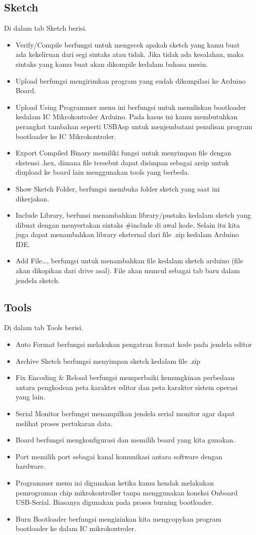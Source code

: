 \subsection{Sketch}
Di dalam tab Sketch berisi.
\begin{itemize}
\item Verify/Compile berfungsi untuk mengecek apakah sketch yang kamu buat ada kekeliruan dari segi sintaks atau tidak. Jika tidak ada kesalahan, maka sintaks yang kamu buat akan dikompile kedalam bahasa mesin.
\item Upload berfungsi mengirimkan program yang sudah dikompilasi ke Arduino Board.
\item Upload Using Programmer menu ini berfungsi untuk menuliskan bootloader kedalam IC Mikrokontroler Arduino. Pada kasus ini kamu membutuhkan perangkat tambahan seperti USBAsp untuk menjembatani penulisan program bootloader ke IC Mikrokontroler.
\item Export Compiled Binary memiliki fungsi untuk menyimpan file dengan ekstensi .hex, dimana file tersebut dapat disimpan sebagai arsip untuk diupload ke board lain menggunakan tools yang berbeda.
\item Show Sketch Folder, berfungsi membuka folder sketch yang saat ini dikerjakan.
\item Include Library, berfunsi menambahkan library/pustaka kedalam sketch yang dibuat dengan menyertakan sintaks \#include di awal kode. Selain itu kita juga dapat menambahkan library eksternal dari file .zip kedalam Arduino IDE.
\item Add File…, berfungsi untuk menambahkan file kedalam sketch arduino (file akan dikopikan dari drive asal). 
File akan muncul sebagai tab baru dalam jendela sketch.
\end{itemize}
\subsection{Tools}
Di dalam tab Tools berisi.
\begin{itemize}
\item Auto Format berfungsi melakukan pengatran format kode pada jendela editor
\item Archive Sketch berfungsi menyimpan sketch kedalam file .zip
\item Fix Encoding \& Reload berfungsi memperbaiki kemungkinan perbedaan antara pengkodean peta karakter editor dan peta karakter sistem operasi yang lain.
\item Serial Monitor berfungsi menampilkan jendela serial monitor agar dapat melihat proses pertukaran data.
\item Board berfungsi mengkonfigurasi dan memilih board yang kita gunakan.
\item Port memilih port sebagai kanal komunikasi antara software dengan hardware.
\item Programmer menu ini digunakan ketika kamu hendak melakukan pemrograman chip mikrokontroller tanpa menggunakan koneksi Onboard USB-Serial. Biasanya digunakan pada proses burning bootloader.
\item Burn Bootloader berfungsi mengizinkan kita mengcopykan program bootloader ke dalam IC mikrokontroler.
\end{itemize}

